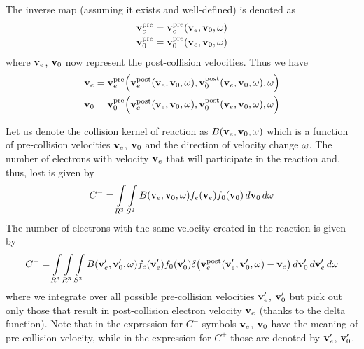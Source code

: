 \documentclass{article}[draft]
\begin{document}
The inverse map (assuming it exists and well-defined) is denoted as 
\begin{align*}
\vect{v}_e^\text{pre} &= \vect{v}_e^\text{pre} \of{\vect{v}_e, \vect{v}_0, \vect{\omega}}
\\
\vect{v}_0^\text{pre} &= \vect{v}_0^\text{pre} \of{\vect{v}_e, \vect{v}_0, \vect{\omega}}
\end{align*} 
where $\mathbf{v}_e$, $\mathbf{v}_0$ now represent the post-collision velocities. Thus we have 
\begin{align*}
\vect{v}_e &= \vect{v}_e^\text{pre} \of{\vect{v}_e^\text{post} \of{\vect{v}_e, \vect{v}_0, \vect{\omega}}, \vect{v}_0^\text{post} \of{\vect{v}_e, \vect{v}_0, \vect{\omega}}, \vect{\omega}}
\\
\vect{v}_0 &= \vect{v}_0^\text{pre} \of{\vect{v}_e^\text{post} \of{\vect{v}_e, \vect{v}_0, \vect{\omega}}, \vect{v}_0^\text{post} \of{\vect{v}_e, \vect{v}_0, \vect{\omega}}, \vect{\omega}}
\end{align*} 

Let us denote the collision kernel of reaction as $B\of{\vect{v}_e, \vect{v}_0, \vect{\omega}}$ which is a function of pre-collision velocities $\mathbf{v}_e$, $\mathbf{v}_0$ and the direction of velocity change $\mathbf{\omega}$. The number of electrons with velocity $\mathbf{v}_e$ that will participate in the reaction and, thus, lost is given by 
\begin{align*}
C^- = \myint_{R^3} \myint_{S^2} B\of{\vect{v}_e, \vect{v}_0, \vect{\omega}} f_e\of{\vect{v}_e} f_0\of{\vect{v}_0} \diff{\vect{v}_0} \diff{\vect{\omega}}
\end{align*}
The number of electrons with the same velocity created in the reaction is given by
\begin{align*}
C^+ = \myint_{R^3} \myint_{R^3} \myint_{S^2} 
B\of{\vect{v}_e^\prime, \vect{v}_0^\prime, \vect{\omega}} 
f_e\of{\vect{v}_e^\prime} f_0\of{\vect{v}_0^\prime} 
\delta\of{\vect{v}_e^\text{post}\of{\vect{v}_e^\prime, \vect{v}_0^\prime, \vect{\omega}} - \vect{v}_e} 
\diff{\vect{v}_0^\prime} \diff{\vect{v}_e^\prime} \diff{\vect{\omega}}
\end{align*}
where we integrate over all possible pre-collision velocities $\mathbf{v}_e^\prime$, $\mathbf{v}_0^\prime$ but pick out only those that result in post-collision electron velocity $\mathbf{v}_e$ (thanks to the delta function). Note that in the expression for $C^-$ symbols $\mathbf{v}_e$, $\mathbf{v}_0$ have the meaning of pre-collision velocity, while in the expression for $C^+$ those are denoted by $\mathbf{v}_e^\prime$, $\mathbf{v}_0^\prime$. 
\end{document}
